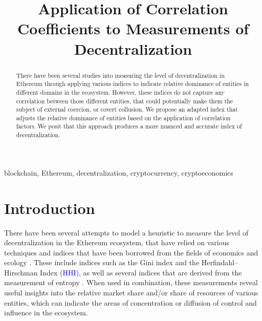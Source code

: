 \documentclass[conference]{IEEEtran}
\newcommand{\leo}[1]{\textcolor{blue}{#1}}
\begin{document}
\title{Application of Correlation Coefficients to Measurements of Decentralization}

\author{
  \and
}

\maketitle

\begin{abstract}
There have been several studies into measuring the level of decentralization in Ethereum through applying various indices to indicate relative dominance of entities in different domains in the ecosystem.  However, these indices do not capture any correlation between those different entities, that could potentially make them the subject of external coercion, or covert collusion.  We propose an adapted index that adjusts the relative dominance of entities based on the application of correlation factors.  We posit that this approach produces a more nuanced and accurate index of decentralization.
\end{abstract}

\begin{IEEEkeywords}
blockchain, Ethereum, decentralization, cryptocurrency, cryptoeconomics
\end{IEEEkeywords}

\section{Introduction}

There have been several attempts to model a heuristic to measure the level of decentralization in the Ethereum ecosystem, that have relied on various techniques and indices that have been borrowed from the fields of economics and ecology \cite{wu2020coefficient} \cite{gupta2018gini} \cite{gochhayat2020measuring} \cite{lee2021dq}.  These include indices such as the Gini index and the Herfindahl–Hirschman Index \leo{(HHI)}, as well as several indices that are derived from the measurement of entropy \cite{brown2023measuring}.  When used in combination, these measurements reveal useful insights into the relative market share and/or share of resources of various entities, which can indicate the areas of concentration or diffusion of control and influence in the ecosystem.
\end{document}
